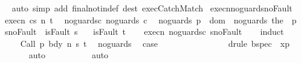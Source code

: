 \begin{isabellebody}
%
\isadelimproof
\ \ %
\endisadelimproof
%
\isatagproof
{}\isamarkupfalse%
\ {\isacharparenleft}auto\ simp\ add{\isacharcolon}\ final{\isacharunderscore}notin{\isacharunderscore}def\ dest{\isacharcolon}\ exec{\isachardot}CatchMatch{\isacharparenright}%
\endisatagproof
{\isafoldproof}%
%
\isadelimproof
%
\endisadelimproof
%
\isamarkuptrue%
\isamarkupfalse%
\ execn{\isacharunderscore}noguards{\isacharunderscore}no{\isacharunderscore}Fault{\isacharcolon}\isanewline
\ \ execn{\isacharcolon}\ {\isachardoublequoteopen}{\isasymGamma}{\isasymturnstile}{\isasymlangle}c{\isacharcomma}s{\isasymrangle}\ {\isacharequal}n{\isasymRightarrow}\ t{\isachardoublequoteclose}\isanewline
\ \ noguards{\isacharunderscore}c{\isacharcolon}\ {\isachardoublequoteopen}noguards\ c{\isachardoublequoteclose}\isanewline
\ \ noguards{\isacharunderscore}{\isasymGamma}{\isacharcolon}\ {\isachardoublequoteopen}{\isasymforall}p\ {\isasymin}\ dom\ {\isasymGamma}{\isachardot}\ noguards\ {\isacharparenleft}the\ {\isacharparenleft}{\isasymGamma}\ p{\isacharparenright}{\isacharparenright}{\isachardoublequoteclose}\isanewline
\ \ s{\isacharunderscore}no{\isacharunderscore}Fault{\isacharcolon}\ {\isachardoublequoteopen}{\isasymnot}\ isFault\ s{\isachardoublequoteclose}\isanewline
\ \ {\isachardoublequoteopen}{\isasymnot}\ isFault\ t{\isachardoublequoteclose}\isanewline
%
\isadelimproof
\ \ %
\endisadelimproof
%
\isatagproof
{}\isamarkupfalse%
\ execn\ noguards{\isacharunderscore}c\ s{\isacharunderscore}no{\isacharunderscore}Fault\isanewline
\ \ \isamarkupfalse%
\ {\isacharparenleft}induct{\isacharparenright}\ \isanewline
\ \ \ \ \isamarkupfalse%
\ {\isacharparenleft}Call\ p\ bdy\ n\ s\ t{\isacharparenright}\ \isamarkupfalse%
\ noguards{\isacharunderscore}{\isasymGamma}\ \isamarkupfalse%
\ {\isacharquery}case\isanewline
\ \ \ \ \ \ \isamarkupfalse%
\ {\isacharminus}\isanewline
\ \ \ \ \ \ \isamarkupfalse%
\ {\isacharparenleft}drule\ bspec\ {\isacharbrackleft}\ x{\isacharequal}p{\isacharbrackright}{\isacharparenright}\isanewline
\ \ \ \ \ \ \isamarkupfalse%
\ auto\isanewline
\ \ \ \ \ \ \isamarkupfalse%
\isanewline
\ \ \isamarkupfalse%
\ {\isacharparenleft}auto{\isacharparenright}%
\endisatagproof
{\isafoldproof}%
%
\isadelimproof
\isanewline
%
\endisadelimproof

\end{isabellebody}
